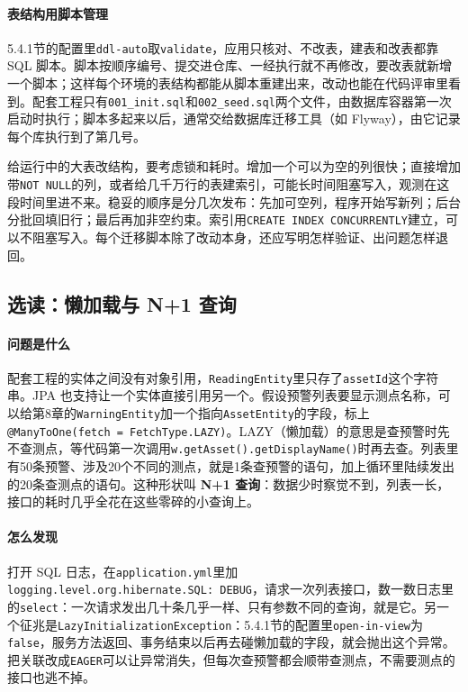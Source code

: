 \paragraph{表结构用脚本管理}5.4.1节的配置里\texttt{ddl-auto}取\texttt{validate}，应用只核对、不改表，建表和改表都靠 SQL 脚本。脚本按顺序编号、提交进仓库、一经执行就不再修改，要改表就新增一个脚本；这样每个环境的表结构都能从脚本重建出来，改动也能在代码评审里看到。配套工程只有\texttt{001\_init.sql}和\texttt{002\_seed.sql}两个文件，由数据库容器第一次启动时执行；脚本多起来以后，通常交给数据库迁移工具（如 Flyway），由它记录每个库执行到了第几号。

给运行中的大表改结构，要考虑锁和耗时。增加一个可以为空的列很快；直接增加带\texttt{NOT NULL}的列，或者给几千万行的表建索引，可能长时间阻塞写入，观测在这段时间里进不来。稳妥的顺序是分几次发布：先加可空列，程序开始写新列；后台分批回填旧行；最后再加非空约束。索引用\texttt{CREATE INDEX CONCURRENTLY}建立，可以不阻塞写入。每个迁移脚本除了改动本身，还应写明怎样验证、出问题怎样退回。

\subsection{选读：懒加载与 N+1 查询}

\paragraph{问题是什么}配套工程的实体之间没有对象引用，\texttt{ReadingEntity}里只存了\texttt{assetId}这个字符串。JPA 也支持让一个实体直接引用另一个。假设预警列表要显示测点名称，可以给第8章的\texttt{WarningEntity}加一个指向\texttt{AssetEntity}的字段，标上\texttt{@ManyToOne(fetch = FetchType.LAZY)}。LAZY（懒加载）的意思是查预警时先不查测点，等代码第一次调用\texttt{w.getAsset().getDisplayName()}时再去查。列表里有50条预警、涉及20个不同的测点，就是1条查预警的语句，加上循环里陆续发出的20条查测点的语句。这种形状叫 \textbf{N+1 查询}：数据少时察觉不到，列表一长，接口的耗时几乎全花在这些零碎的小查询上。

\paragraph{怎么发现}打开 SQL 日志，在\texttt{application.yml}里加\texttt{logging.level.org.hibernate.SQL:\ DEBUG}，请求一次列表接口，数一数日志里的\texttt{select}：一次请求发出几十条几乎一样、只有参数不同的查询，就是它。另一个征兆是\texttt{LazyInitializationException}：5.4.1节的配置里\texttt{open-in-view}为\texttt{false}，服务方法返回、事务结束以后再去碰懒加载的字段，就会抛出这个异常。把关联改成\texttt{EAGER}可以让异常消失，但每次查预警都会顺带查测点，不需要测点的接口也逃不掉。

